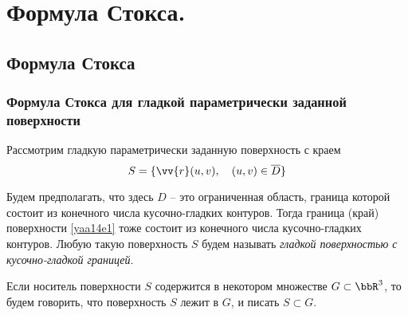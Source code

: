 \chapter{Формула Стокса.}
\section{Формула Стокса}
\subsection{Формула Стокса для гладкой параметрически заданной поверхности}
Рассмотрим гладкую параметрически заданную поверхность с краем
\begin{equation} \label{yaa14e1}
S=\{\vv{r}(u,v),\quad(u,v)\in\overline{D} \}
\end{equation}

Будем предполагать, что здесь $D$ -- это ограниченная область, граница которой состоит из конечного числа кусочно-гладких контуров. Тогда граница (край) поверхности \eqref{yaa14e1} тоже состоит из конечного числа кусочно-гладких контуров. Любую такую поверхность $S$ будем называть \textit{гладкой поверхностью с кусочно-гладкой границей}.

Если носитель поверхности $S$ содержится в некотором множестве $G\subset \bbR^3$, то будем говорить, что поверхность $S$ лежит в $G$, и писать $S\subset G$.


